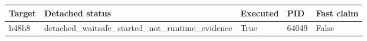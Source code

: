 {\small
\begin{tabular}{lllll}
\hline
Target & Detached status & Executed & PID & Fast claim \\
\hline
h48h8 & detached\_waitsafe\_started\_not\_runtime\_evidence & True & 64049 & False \\
\hline
\end{tabular}
}
